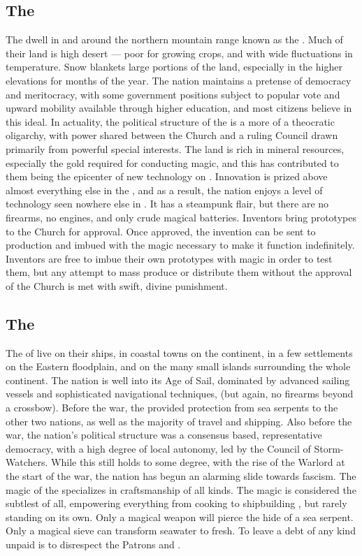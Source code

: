 \documentclass[blue]{GL2020}
\begin{document}
\subsection*{The \pTech{}}
The \pTech{} dwell in and around the northern mountain range known as the \pSpine{}. Much of their land is high desert — poor for growing crops, and with wide fluctuations in temperature. Snow blankets large portions of the land, especially in the higher elevations for months of the year. The nation maintains a pretense of democracy and meritocracy, with some government positions subject to popular vote and upward mobility available through higher education, and most citizens believe in this ideal. In actuality, the political structure of the \pTech{} is a more of a theocratic oligarchy, with power shared between the Church and a ruling Council drawn primarily from powerful special interests. The \pTech{} land is rich in mineral resources, especially the gold required for conducting magic, and this has contributed to them being the epicenter of new technology on \pEarth{}. Innovation is prized above almost everything else in the \pTech{}, and as a result, the nation enjoys a level of technology seen nowhere else in \pEarth{}. It has a steampunk flair, but there are no firearms, no engines, and only crude magical batteries. Inventors bring prototypes to the Church for approval. Once approved, the invention can be sent to production and imbued with the magic necessary to make it function indefinitely. Inventors are free to imbue their own prototypes with magic in order to test them, but any attempt to mass produce or distribute them without the approval of the Church is met with swift, divine punishment.

\subsection*{The \pShip{}}
The \pShippies{} of \pShip{} live on their ships, in coastal towns on the continent, in a few settlements on the Eastern floodplain, and on the many small islands surrounding the whole continent. The nation is well into its Age of Sail, dominated by advanced sailing vessels and sophisticated navigational techniques, (but again, no firearms beyond a crossbow). Before the war, the \pShippies{} provided protection from sea serpents to the other two nations, as well as the majority of travel and shipping. Also before the war, the nation's political structure was a consensus based, representative democracy, with a high degree of local autonomy, led by the Council of Storm-Watchers. While this still holds to some degree, with the rise of the Warlord \cLoud{\full} at the start of the war, the nation has begun an alarming slide towards fascism. The magic of the \pShippies{} specializes in craftsmanship of all kinds. The \pShip{} magic is considered the subtlest of all, empowering everything from cooking to shipbuilding , but rarely standing on its own. Only a magical weapon will pierce the hide of a sea serpent. Only a magical sieve can transform seawater to fresh. To leave a debt of any kind unpaid is to disrespect the Patrons \cEbbFull{} and \cFlowFull{}.
\end{document}
